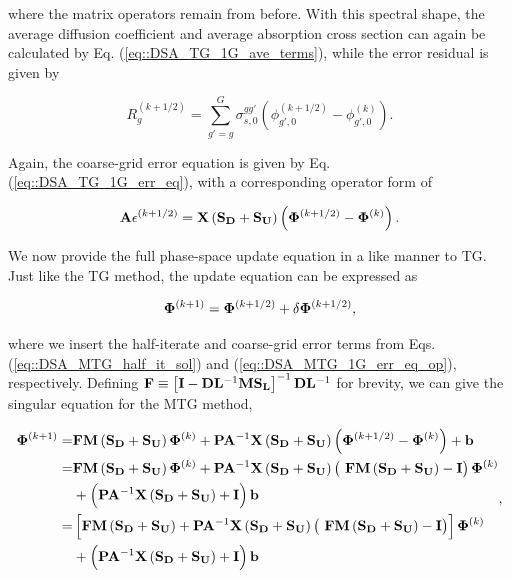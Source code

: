 \noindent where the matrix operators remain from before. With this spectral shape, the average diffusion coefficient and average absorption cross section can again be calculated by Eq. (\ref{eq::DSA_TG_1G_ave_terms}), while the error residual is given by

\begin{equation}
\label{eq::DSA_MTG_diff_residual}
R_g^{(k+1/2)} = \sum_{g'=g}^G \sigma_{s,0}^{g g'} \left( \phi_{g',0}^{(k+1/2)} - \phi_{g',0}^{(k)} \right) .
\end{equation}

\noindent Again, the coarse-grid error equation is given by Eq. (\ref{eq::DSA_TG_1G_err_eq}), with a corresponding operator form of 

\begin{equation}
\label{eq::DSA_MTG_1G_err_eq_op}
{\bf A} \epsilon^{(k+1/2)}  =  {\bf X} \left( {\bf S_{D}} + {\bf S_{U}} \right) \left(  {\bf \Phi}^{(k+1/2)} - {\bf \Phi}^{(k)}  \right).
\end{equation}

We now provide the full phase-space update equation in a like manner to TG. Just like the TG method, the update equation can be expressed as 

\begin{equation}
\label{eq::DSA_MTG_update_op}
 {\bf \Phi}^{(k+1)} =  {\bf \Phi}^{(k+1/2)}  + \delta {\bf \Phi}^{(k+1/2)} ,
\end{equation}

\noindent where we insert the half-iterate and coarse-grid error terms from Eqs. (\ref{eq::DSA_MTG_half_it_sol}) and (\ref{eq::DSA_MTG_1G_err_eq_op}), respectively. Defining ${\bf F} \equiv \left[ {\bf I} - {\bf D}{\bf L}^{-1} {\bf M}{\bf S_L}\right]^{-1} {\bf D}{\bf L}^{-1} $ for brevity, we can give the singular equation for the MTG method,

\begin{equation}
\label{eq::DSA_MTG_op_update_simple}
\begin{aligned}
 {\bf \Phi}^{(k+1)} =  &{\bf F}  {\bf M} \left( {\bf S_{D}} + {\bf S_{U}} \right) {\bf \Phi}^{(k)} +  {\bf P} {\bf A}^{-1}  {\bf X} \left( {\bf S_{D}} + {\bf S_{U}} \right) \left(  {\bf \Phi}^{(k+1/2)} - {\bf \Phi}^{(k)}  \right) + {\bf b} \\
= &{\bf F}  {\bf M}\left( {\bf S_{D}} + {\bf S_{U}} \right) {\bf \Phi}^{(k)} +  {\bf P} {\bf A}^{-1}  {\bf X} \left( {\bf S_{D}} + {\bf S_{U}} \right) \left(  \ {\bf F}  {\bf M}\left( {\bf S_{D}} + {\bf S_{U}} \right)  -  {\bf I} \right){\bf \Phi}^{(k)} \\
&+ \left(  {\bf P} {\bf A}^{-1}  {\bf X} \left( {\bf S_{D}} + {\bf S_{U}} \right)  + {\bf I} \right) {\bf b} \\
= &\left[ {\bf F}  {\bf M} \left( {\bf S_{D}} + {\bf S_{U}} \right) +  {\bf P} {\bf A}^{-1}  {\bf X} \left( {\bf S_{D}} + {\bf S_{U}} \right) \left(  \ {\bf F}  {\bf M} \left( {\bf S_{D}} + {\bf S_{U}} \right)  -  {\bf I} \right) \right] {\bf \Phi}^{(k)} \\
&+ \left(  {\bf P} {\bf A}^{-1}  {\bf X} \left( {\bf S_{D}} + {\bf S_{U}} \right)  + {\bf I} \right) {\bf b}
\end{aligned} ,
\end{equation}

